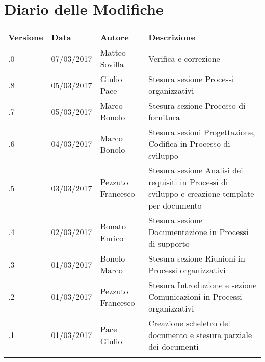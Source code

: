 \section*{Diario delle Modifiche}
\begin{longtabu} to \textwidth {
	X[4,l,p]
	X[4,l,p]
	X[4,l,p]
	X[8,l,p]}
	\toprule
		 Versione & Data & Autore & Descrizione \\
		\midrule
		\endhead
		
		\addlinespace[0.2em]
		\midrule
		.0 & 07/03/2017 & Matteo Sovilla & Verifica e correzione\\
		\addlinespace[0.2em]
		\midrule
		.8 & 05/03/2017 & Giulio Pace & Stesura sezione Processi organizzativi\\
		\addlinespace[0.2em]
		\midrule
		.7 & 05/03/2017 & Marco Bonolo & Stesura sezione Processo di fornitura\\
		\addlinespace[0.2em]
		\midrule
		.6 & 04/03/2017 & Marco Bonolo & Stesura sezioni Progettazione, Codifica in Processo di sviluppo\\
		\addlinespace[0.2em]
		\midrule
		.5 & 03/03/2017 & Pezzuto Francesco & Stesura sezione Analisi dei requisiti in Processi di sviluppo e creazione template per documento\\
		\addlinespace[0.2em]
		\midrule
		.4 & 02/03/2017 & Bonato Enrico & Stesura sezione Documentazione in Processi di supporto\\
		\addlinespace[0.2em]
		\midrule
		.3 & 01/03/2017 & Bonolo Marco & Stesura sezione Riunioni in Processi organizzativi\\
		\addlinespace[0.2em]
		\midrule
		.2 & 01/03/2017 & Pezzuto Francesco & Stesura Introduzione e sezione Comunicazioni in Processi organizzativi\\
		\addlinespace[0.2em]
		\midrule
		.1 & 01/03/2017 & Pace Giulio & Creazione scheletro del documento e stesura parziale dei documenti\\
		\addlinespace[0.4em]
		
	\bottomrule
\end{longtabu}